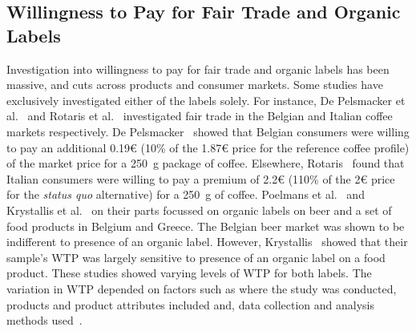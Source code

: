 \documentclass[sustainability,article,accept,moreauthors,pdftex,10pt,a4paper]{Definitions/mdpi}
\theoremstyle{mdpi}
\newcounter{ex}
\newcounter{re}
\theoremstyle{mdpidefinition}
\begin{document}
\subsection{Willingness to Pay for Fair Trade and Organic Labels}
\par{Investigation into willingness to pay for fair trade and organic labels has been massive, and  cuts across products and consumer markets. Some studies have exclusively investigated either of the labels solely. For instance, De Pelsmacker et al.~\cite{DePelsmacker2005} and Rotaris et al.~\cite{Rotaris2011} investigated fair trade in the Belgian and Italian coffee markets respectively. De Pelsmacker~\cite{DePelsmacker2005} showed that Belgian consumers were willing to pay an additional 0.19\euro \hspace{1mm} (10\% of the  1.87\euro \hspace{1mm} price for the reference coffee profile) of the market price for a 250~g package of coffee. Elsewhere, Rotaris~\cite{Rotaris2011} found that Italian consumers were willing to pay a premium of 2.2\euro \hspace{1mm} (110\% of the  2\euro \hspace{1mm} price for the \textit{status quo} alternative) for a 250~g of coffee. Poelmans et al.~\cite{Poelmans2017} and Krystallis et al.~\cite{Krystallis2005} on their parts focussed on organic labels on beer and a set of food products in Belgium and Greece. The Belgian beer market was shown to be indifferent to presence of an organic label. However, Krystallis~\cite{Krystallis2005} showed that their sample's WTP was largely sensitive to presence of an organic label on a food product. These studies showed varying levels of WTP for both labels. The variation in WTP depended on factors such as where the study was conducted, products and product attributes included and, data collection and analysis methods used~\cite{Rotaris2011}.}
\end{document}
